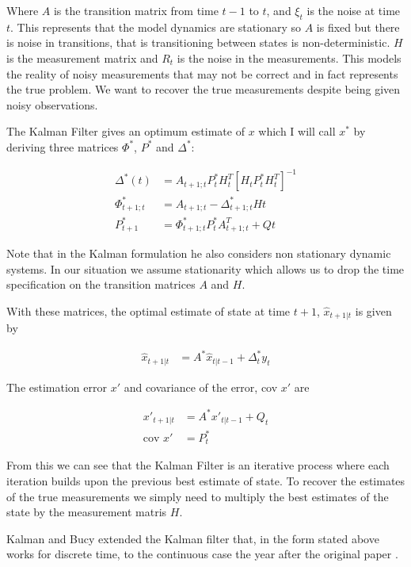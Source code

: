 \documentclass[]{../resources/final_report}
\begin{document}
Where $A$ is the transition matrix from time $t-1$ to $t$, and $\xi_t$ is the noise at time $t$. 
This represents that the model dynamics are stationary so $A$ is fixed but there is noise in 
transitions, that is transitioning between states is non-deterministic. $H$ is the measurement 
matrix and $R_t$ is the noise in the measurements. This models the reality of noisy measurements 
that may not be correct and in fact represents the true problem. We want to recover the true 
measurements despite being given noisy observations.

The Kalman Filter gives an optimum estimate of $x$ which I will call $x^*$ by deriving three matrices 
$\Phi^*$, $P^*$ and $\Delta^*$:

\begin{align}
  \Delta^*(t) &= A_{t+1;t}P^*_tH^T_t[H_tP^*_tH^T_t]^{-1} \\
  \Phi^*_{t+1;t} &= A_{t+1;t} - \Delta^*_{t+1;t}H{t} \\
  P^*_{t+1} &= \Phi^*_{t+1;t}P^*_tA^T_{t+1;t} + Q{t}
\end{align}

\pagebreak
Note that in the Kalman formulation he also considers non stationary dynamic systems. In our 
situation we assume stationarity which allows us to drop the time specification on the transition 
matrices $A$ and $H$.

With these matrices, the optimal estimate of state at time $t+1$, $\hat{x}_{t+1|t}$ is given by 

\begin{align}
  \hat{x}_{t+1|t} &= A^*\hat{x}_{t|t-1} + \Delta^*_ty_t
\end{align}

The estimation error $x'$ and covariance of the error, cov $x'$ are

\begin{align}
  x'_{t+1|t} &= A^*x'_{t|t-1} + Q_t \\
  \text{cov } x' &= P^*_t
\end{align}

From this we can see that the Kalman Filter is an iterative process where each iteration builds upon 
the previous best estimate of state. To recover the estimates of the true measurements we simply 
need to multiply the best estimates of the state by the measurement matris $H$.

Kalman and Bucy extended the Kalman filter that, in the form stated above works for discrete time, to the 
continuous case the year after the original paper \cite{Klmn1961NewRI}.
\end{document}
